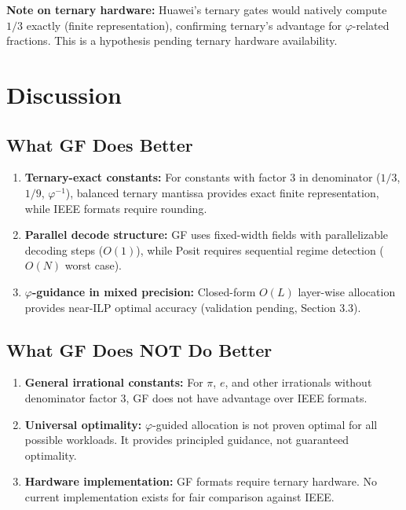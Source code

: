 \documentclass{article}
\begin{document}
\textbf{Note on ternary hardware:} Huawei's ternary gates would natively compute $1/3$ exactly (finite representation), confirming ternary's advantage for $\varphi$-related fractions. This is a hypothesis pending ternary hardware availability.


\section{Discussion}

\subsection{What GF Does Better}

\begin{enumerate}
    \item \textbf{Ternary-exact constants:} For constants with factor 3 in denominator ($1/3$, $1/9$, $\varphi^{-1}$), balanced ternary mantissa provides exact finite representation, while IEEE formats require rounding.

    \item \textbf{Parallel decode structure:} GF uses fixed-width fields with parallelizable decoding steps ($O(1)$), while Posit requires sequential regime detection ($O(N)$ worst case).

    \item \textbf{$\varphi$-guidance in mixed precision:} Closed-form $O(L)$ layer-wise allocation provides near-ILP optimal accuracy (validation pending, Section 3.3).
\end{enumerate}

\subsection{What GF Does NOT Do Better}

\begin{enumerate}
    \item \textbf{General irrational constants:} For $\pi$, $e$, and other irrationals without denominator factor 3, GF does not have advantage over IEEE formats.

    \item \textbf{Universal optimality:} $\varphi$-guided allocation is not proven optimal for all possible workloads. It provides principled guidance, not guaranteed optimality.

    \item \textbf{Hardware implementation:} GF formats require ternary hardware. No current implementation exists for fair comparison against IEEE.
\end{enumerate}
\end{document}

